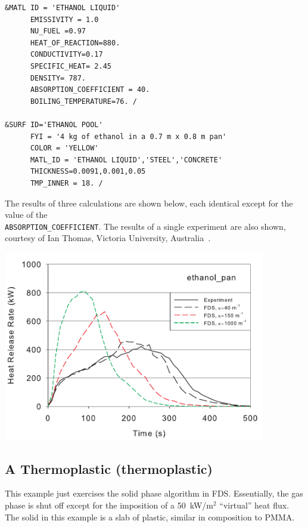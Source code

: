 \documentclass[11pt]{book}
\newcommand{\ct}{\tt\small}
\begin{document}
\scriptsize
\begin{verbatim}
&MATL ID = 'ETHANOL LIQUID'
      EMISSIVITY = 1.0
      NU_FUEL =0.97
      HEAT_OF_REACTION=880.
      CONDUCTIVITY=0.17
      SPECIFIC_HEAT= 2.45
      DENSITY= 787.
      ABSORPTION_COEFFICIENT = 40.
      BOILING_TEMPERATURE=76. /

&SURF ID='ETHANOL POOL'
      FYI = '4 kg of ethanol in a 0.7 m x 0.8 m pan'
      COLOR = 'YELLOW'
      MATL_ID = 'ETHANOL LIQUID','STEEL','CONCRETE'
      THICKNESS=0.0091,0.001,0.05
      TMP_INNER = 18. /
\end{verbatim} \normalsize

\noindent
The results of three calculations are shown below, each identical except for the value of the \\ {\ct ABSORPTION\_COEFFICIENT}. The results of a single experiment
are also shown, courtesy of Ian Thomas, Victoria University, Australia~\cite{Thomas:JFPE}.


\begin{center}
\includegraphics[width=4.5in]{FIGURES/ethanol_pan_HRR}
\end{center}



\clearpage
\subsection{A Thermoplastic ({\bf thermoplastic}) }
\label{thermoplastic}

This example just exercises the solid phase algorithm in
FDS. Essentially, the gas phase is shut off except for the imposition
of a 50~kW/m$^2$ ``virtual'' heat flux. The solid in this example is a
slab of plastic, similar in composition to PMMA.
\end{document}
